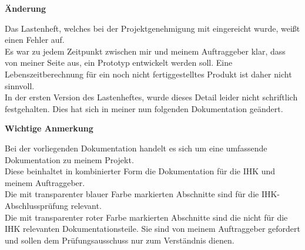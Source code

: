 \vspace{2cm}

\begin{center}
\begin{Huge}
\textbf{Änderung}
\end{Huge}
\end{center}
Das Lastenheft, welches bei der Projektgenehmigung mit eingereicht wurde, weißt einen Fehler auf. 
\\
Es war zu jedem Zeitpunkt zwischen mir und meinem Auftraggeber klar, dass von meiner Seite aus, ein Prototyp entwickelt werden soll. Eine Lebenszeitberechnung für ein noch nicht fertiggestelltes Produkt ist daher nicht sinnvoll.
\\
In der ersten Version des Lastenheftes, wurde dieses Detail leider nicht schriftlich festgehalten. Dies hat sich in meiner nun folgenden Dokumentation geändert.



\vspace{5cm}

\begin{Huge}
\begin{center}
\textbf{Wichtige Anmerkung}
\end{center}
\end{Huge}
Bei der vorliegenden Dokumentation handelt es sich um eine umfassende Dokumentation zu meinem Projekt. 
\\
Diese beinhaltet in kombinierter Form die Dokumentation für die IHK und meinem Auftraggeber.
\\
Die mit transparenter blauer Farbe markierten Abschnitte sind für die IHK-Abschlussprüfung relevant. 
\\
Die mit transparenter roter Farbe markierten Abschnitte sind die nicht für die IHK relevanten Dokumentationsteile. Sie sind von meinem Auftraggeber gefordert und sollen dem Prüfungsausschuss nur zum Verständnis dienen.




